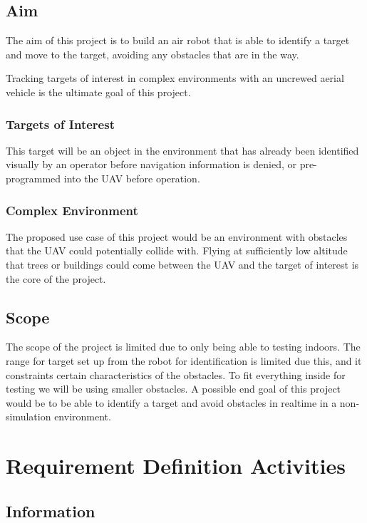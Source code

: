 \documentclass{article}
\begin{document}
	\subsection{Aim}
	
	The aim of this project is to build an air robot that is able to identify a target and move to the target, avoiding any obstacles that are in the way. 
	
	Tracking targets of interest in complex environments with an uncrewed aerial vehicle is the ultimate goal of this project. 
	
		\subsubsection{Targets of Interest}
		
		This target will be an object in the environment that has already been identified visually by an operator before navigation information is denied, or pre-programmed into the UAV before operation.
		
		\subsubsection{Complex Environment}
		
		The proposed use case of this project would be an environment with obstacles that the UAV could potentially collide with. Flying at sufficiently low altitude that trees or buildings could come between the UAV and the target of interest is the core of the project.
		
	\subsection{Scope}
	The scope of the project is limited due to only being able to testing indoors. The range for target set up from the robot for identification is limited due this, and it constraints certain characteristics of the obstacles. To fit everything inside for testing we will be using smaller obstacles. A possible end goal of this project would be to be able to identify a target and avoid obstacles in realtime in a non-simulation environment. 

\section{Requirement Definition Activities}

	\subsection{Information}
	
\end{document}
